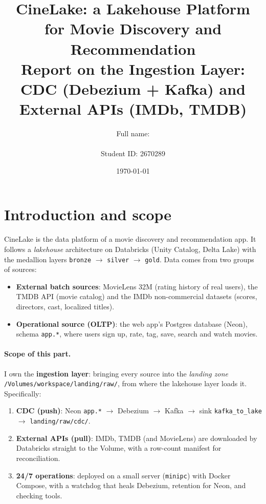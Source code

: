 \documentclass[12pt,a4paper]{article}
\title{\textbf{CineLake: a Lakehouse Platform for Movie Discovery and Recommendation}\\[4pt]
\large Report on the \textbf{Ingestion Layer}: CDC (Debezium + Kafka) and External APIs (IMDb, TMDB)}
\author{Full name: \rule{5cm}{0.4pt} \qquad Student ID: 2670289}
\date{\today}
\newcommand{\code}[1]{\texttt{#1}}
\begin{document}
\maketitle
\tableofcontents
\listoffigures
\newpage

\section{Introduction and scope}

CineLake is the data platform of a movie discovery and recommendation app. It follows a \emph{lakehouse}
architecture on Databricks (Unity Catalog, Delta Lake) with the medallion layers
\code{bronze} $\rightarrow$ \code{silver} $\rightarrow$ \code{gold}. Data comes from two groups of sources:

\begin{itemize}
  \item \textbf{External batch sources}: MovieLens 32M (rating history of real users), the TMDB API (movie
        catalog) and the IMDb non-commercial datasets (scores, directors, cast, localized titles).
  \item \textbf{Operational source (OLTP)}: the web app's Postgres database (Neon), schema \code{app.*}, where users
        sign up, rate, tag, save, search and watch movies.
\end{itemize}

\paragraph{Scope of this part.} I own the \textbf{ingestion layer}: bringing every source into the
\emph{landing zone} \code{/Volumes/workspace/landing/raw/}, from where the lakehouse layer loads it. Specifically:
\begin{enumerate}
  \item \textbf{CDC (push)}: Neon \code{app.*} $\rightarrow$ Debezium $\rightarrow$ Kafka $\rightarrow$
        sink \code{kafka\_to\_lake} $\rightarrow$ \code{landing/raw/cdc/}.
  \item \textbf{External APIs (pull)}: IMDb, TMDB (and MovieLens) are downloaded by Databricks straight to the
        Volume, with a row-count manifest for reconciliation.
  \item \textbf{24/7 operations}: deployed on a small server (\code{minipc}) with Docker Compose, with a watchdog that
        heals Debezium, retention for Neon, and checking tools.
\end{enumerate}
\end{document}
